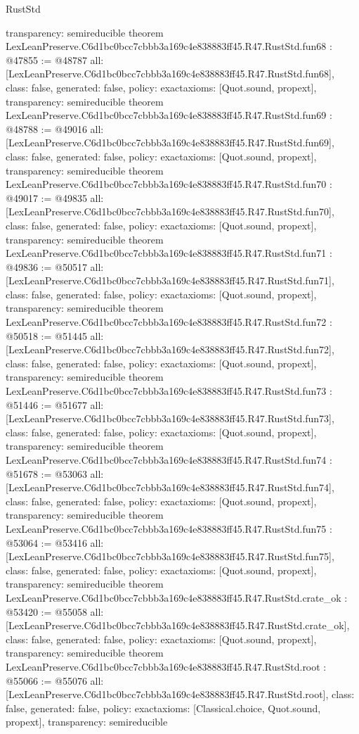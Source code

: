\begin{lexlean}{RustStd}
\begin{coremodule}
{  transparency: semireducible
}
theorem LexLeanPreserve.C6d1bc0bcc7cbbb3a169c4e838883ff45.R47.RustStd.fun68 : @47855 := @48787 {
  all: [LexLeanPreserve.C6d1bc0bcc7cbbb3a169c4e838883ff45.R47.RustStd.fun68],
  class: false,
  generated: false,
  policy: exact{axioms: [Quot.sound, propext]},
  transparency: semireducible
}
theorem LexLeanPreserve.C6d1bc0bcc7cbbb3a169c4e838883ff45.R47.RustStd.fun69 : @48788 := @49016 {
  all: [LexLeanPreserve.C6d1bc0bcc7cbbb3a169c4e838883ff45.R47.RustStd.fun69],
  class: false,
  generated: false,
  policy: exact{axioms: [Quot.sound, propext]},
  transparency: semireducible
}
theorem LexLeanPreserve.C6d1bc0bcc7cbbb3a169c4e838883ff45.R47.RustStd.fun70 : @49017 := @49835 {
  all: [LexLeanPreserve.C6d1bc0bcc7cbbb3a169c4e838883ff45.R47.RustStd.fun70],
  class: false,
  generated: false,
  policy: exact{axioms: [Quot.sound, propext]},
  transparency: semireducible
}
theorem LexLeanPreserve.C6d1bc0bcc7cbbb3a169c4e838883ff45.R47.RustStd.fun71 : @49836 := @50517 {
  all: [LexLeanPreserve.C6d1bc0bcc7cbbb3a169c4e838883ff45.R47.RustStd.fun71],
  class: false,
  generated: false,
  policy: exact{axioms: [Quot.sound, propext]},
  transparency: semireducible
}
theorem LexLeanPreserve.C6d1bc0bcc7cbbb3a169c4e838883ff45.R47.RustStd.fun72 : @50518 := @51445 {
  all: [LexLeanPreserve.C6d1bc0bcc7cbbb3a169c4e838883ff45.R47.RustStd.fun72],
  class: false,
  generated: false,
  policy: exact{axioms: [Quot.sound, propext]},
  transparency: semireducible
}
theorem LexLeanPreserve.C6d1bc0bcc7cbbb3a169c4e838883ff45.R47.RustStd.fun73 : @51446 := @51677 {
  all: [LexLeanPreserve.C6d1bc0bcc7cbbb3a169c4e838883ff45.R47.RustStd.fun73],
  class: false,
  generated: false,
  policy: exact{axioms: [Quot.sound, propext]},
  transparency: semireducible
}
theorem LexLeanPreserve.C6d1bc0bcc7cbbb3a169c4e838883ff45.R47.RustStd.fun74 : @51678 := @53063 {
  all: [LexLeanPreserve.C6d1bc0bcc7cbbb3a169c4e838883ff45.R47.RustStd.fun74],
  class: false,
  generated: false,
  policy: exact{axioms: [Quot.sound, propext]},
  transparency: semireducible
}
theorem LexLeanPreserve.C6d1bc0bcc7cbbb3a169c4e838883ff45.R47.RustStd.fun75 : @53064 := @53416 {
  all: [LexLeanPreserve.C6d1bc0bcc7cbbb3a169c4e838883ff45.R47.RustStd.fun75],
  class: false,
  generated: false,
  policy: exact{axioms: [Quot.sound, propext]},
  transparency: semireducible
}
theorem LexLeanPreserve.C6d1bc0bcc7cbbb3a169c4e838883ff45.R47.RustStd.crate_ok : @53420 := @55058 {
  all: [LexLeanPreserve.C6d1bc0bcc7cbbb3a169c4e838883ff45.R47.RustStd.crate_ok],
  class: false,
  generated: false,
  policy: exact{axioms: [Quot.sound, propext]},
  transparency: semireducible
}
theorem LexLeanPreserve.C6d1bc0bcc7cbbb3a169c4e838883ff45.R47.RustStd.root : @55066 := @55076 {
  all: [LexLeanPreserve.C6d1bc0bcc7cbbb3a169c4e838883ff45.R47.RustStd.root],
  class: false,
  generated: false,
  policy: exact{axioms: [Classical.choice, Quot.sound, propext]},
  transparency: semireducible
}


\end{coremodule}
\end{lexlean}

